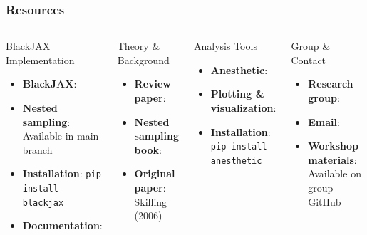 \documentclass[aspectratio=169]{beamer}
\begin{document}
\begin{frame}
    \frametitle{Resources}
    \begin{columns}
        \begin{block}{BlackJAX Implementation}
            \begin{itemize}
                \item \textbf{BlackJAX}: 
                \item \textbf{Nested sampling}: Available in main branch
                \item \textbf{Installation}: \texttt{pip install blackjax}
                \item \textbf{Documentation}: 
            \end{itemize}
        \end{block}
        \begin{block}{Theory \& Background}
            \begin{itemize}
                \item \textbf{Review paper}: 
                \item \textbf{Nested sampling book}: 
                \item \textbf{Original paper}: Skilling (2006) 
            \end{itemize}
        \end{block}
        \begin{block}{Analysis Tools}
            \begin{itemize}
                \item \textbf{Anesthetic}: 
                \item \textbf{Plotting \& visualization}: 
                \item \textbf{Installation}: \texttt{pip install anesthetic}
            \end{itemize}
        \end{block}
        \begin{block}{Group \& Contact}
            \begin{itemize}
                \item \textbf{Research group}: 
                \item \textbf{Email}: 
                \item \textbf{Workshop materials}: Available on group GitHub
            \end{itemize}
        \end{block}
    \end{columns}
\end{frame}
\end{document}
